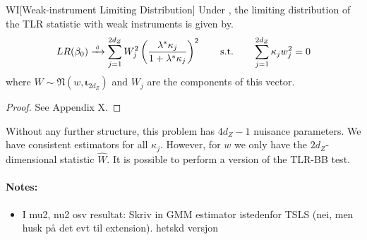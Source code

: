 \begin{propositionp}{WI}[Weak-instrument Limiting Distribution]
\label{prop:wi}
    Under , the limiting distribution of the TLR statistic with weak instruments is given by.
    \begin{align}
    LR(\beta_0) \xrightarrow{{\scriptscriptstyle \mathrm{\;d\;}}} \sum_{j=1}^{2d_Z}  W_j^2\left(\frac{\lambda^*  \kappa_j}{1+\lambda^* \kappa_j}\right)^2 \qquad \text{s.t.} \qquad \sum_{j=1}^{2d_Z}\kappa_j w_j^2 = 0
\end{align}
where \(W\sim \mathfrak{N}(w,\boldsymbol{\iota}_{2d_Z})\) and \(W_j\) are the components of this vector.
\end{propositionp}
\begin{proof}
    See Appendix X.
\end{proof}
\noindent
Without any further structure, this problem has \(4d_Z-1\) nuisance parameters. We have consistent estimators for all \(\kappa_j\). However, for \(w\) we only have the \(2d_Z\)-dimensional statistic \(\hat W\). It is possible to perform a version of the TLR-BB test.



\paragraph{Notes:}
\begin{itemize}
    \item 
        I mu2, nu2 osv resultat: Skriv in GMM estimator istedenfor TSLS (nei, men husk på det evt til extension). hetskd versjon
\end{itemize}

